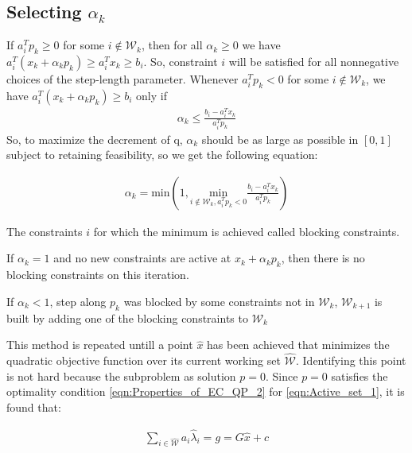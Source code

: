 \subsection*{Selecting $\alpha_k$}
If $a_{i}^{T}p_{k} \geqslant 0$ for some $i\notin \mathcal{W}_k$, then for all $\alpha_k \geqslant 0$ we have $a_{i}^T(x_k+\alpha_kp_k)\geqslant a_{i}^Tx_k \geqslant b_i$. So, constraint $i$ will be satisfied for all nonnegative choices of the step-length parameter. Whenever $a_i^Tp_k < 0$ for some $i\notin \mathcal{W}_k$, we have  $a_{i}^T(x_k+\alpha_kp_k) \geqslant b_i$ only if
\begin{equation*}
	\begin{aligned}
		\alpha_k \leqslant \frac{b_i-a_i^Tx_k}{a_i^Tp_k}
	\end{aligned}
\end{equation*}
So, to maximize the decrement of q, $\alpha_k$ should be as large as possible in $[0,1]$ subject to retaining feasibility, so we get the following equation:

\begin{equation}
	\begin{aligned}
		\alpha_k = {\text{min}} \left( 1, \underset{i\notin \mathcal{W}_k,a_i^Tp_k<0 }{\text{min}} \frac{b_i-a_i^Tx_k}{a_i^Tp_k} \right) 
	\end{aligned}
\end{equation}

The constraints $i$ for which the minimum is achieved called blocking constraints. 

If $\alpha_k = 1$ and no new constraints are active at $ x_k+\alpha_kp_k $, then there is no blocking constraints on this iteration. 

If $\alpha_k < 1$, step along $p_k$ was blocked by some constraints not in $\mathcal{W}_k$, $\mathcal{W}_{k+1}$ is built by adding one of the blocking constraints to $\mathcal{W}_k$

This method is repeated untill a point $\hat{x}$ has been achieved that minimizes the quadratic objective function over its current working set $\hat{\mathcal{W}}$. Identifying this point is not hard because the subproblem as solution $p=0$. Since $p=0$ satisfies the optimality condition \ref{eqn:Properties_of_EC_QP_2} for \ref{eqn:Active_set_1}, it is found that:

\begin{equation}
	\begin{aligned}
		\underset{i\in \hat{\mathcal{W}}}{\sum}a_i\hat{\lambda}_i = g = G\hat{x}+c
	\end{aligned}
	\label{eqn:Active_set_3}
\end{equation}

